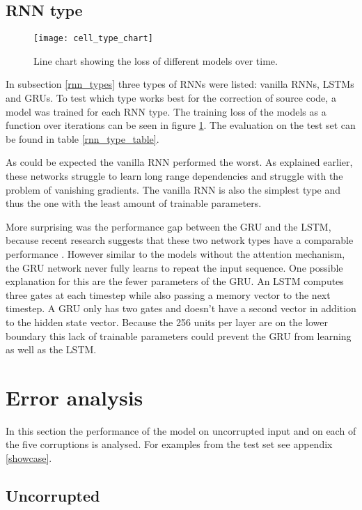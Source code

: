 \subsection{RNN type}

\begin{figure}[p]
\centering
\texttt{[image: cell\_type\_chart]}
\caption{Line chart showing the loss of different models over time.}
\label{cell_type_chart}
\end{figure}

In subsection \ref{rnn_types} three types of RNNs were listed: vanilla RNNs, LSTMs and GRUs. To test which type works best for the correction of source code, a model was trained for each RNN type. The training loss of the models as a function over iterations can be seen in figure \ref{cell_type_chart}. The evaluation on the test set can be found in table \ref{rnn_type_table}.

As could be expected the vanilla RNN performed the worst. As explained earlier, these networks struggle to learn long range dependencies and struggle with the problem of vanishing gradients. The vanilla RNN is also the simplest type and thus the one with the least amount of trainable parameters.

More surprising was the performance gap between the GRU and the LSTM, because recent research suggests that these two network types have a comparable performance \cite{lstm_vs_gru}. However similar to the models without the attention mechanism, the GRU network never fully learns to repeat the input sequence. One possible explanation for this are the fewer parameters of the GRU. An LSTM computes three gates at each timestep while also passing a memory vector to the next timestep. A GRU only has two gates and doesn't have a second vector in addition to the hidden state vector. Because the 256 units per layer are on the lower boundary this lack of trainable parameters could prevent the GRU from learning as well as the LSTM.

\section{Error analysis}
\label{error_analysis}

In this section the performance of the model on uncorrupted input and on each of the five corruptions is analysed. For examples from the test set see appendix \ref{showcase}.

\subsection{Uncorrupted}

